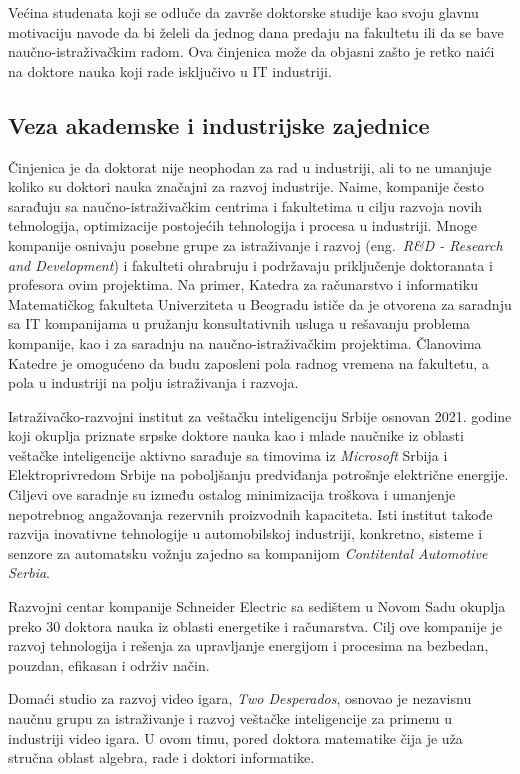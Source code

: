\documentclass[a4paper]{article}
\begin{document}
Većina studenata koji se odluče da završe doktorske studije kao svoju glavnu motivaciju navode da bi želeli da jednog dana predaju na fakultetu ili da se bave naučno-istraživačkim radom. Ova činjenica može da objasni zašto je retko naići na doktore nauka koji rade isključivo u IT industriji.

\subsection{Veza akademske i industrijske zajednice}

Činjenica je da doktorat nije neophodan za rad u industriji, ali to ne umanjuje koliko su doktori nauka značajni za razvoj industrije. Naime, kompanije često sarađuju sa naučno-istraživačkim centrima i fakultetima u cilju razvoja novih tehnologija, optimizacije postojećih tehnologija i procesa u industriji. Mnoge kompanije osnivaju posebne grupe za istraživanje i razvoj (eng.~{\em R\&D - Research and Development}) i fakulteti ohrabruju i podržavaju priključenje doktoranata i profesora ovim projektima. Na primer, Katedra za računarstvo i informatiku Matematičkog fakulteta Univerziteta u Beogradu ističe da je otvorena za saradnju sa IT kompanijama u pružanju konsultativnih usluga u rešavanju problema kompanije, kao i za saradnju na naučno-istraživačkim projektima. Članovima Katedre je omogućeno da budu zaposleni pola radnog vremena na fakultetu, a pola u industriji na polju istraživanja i razvoja.\cite{katedra}

Istraživačko-razvojni institut za veštačku inteligenciju Srbije osnovan 2021. godine koji okuplja priznate srpske doktore nauka kao i mlade naučnike iz oblasti veštačke inteligencije aktivno sarađuje sa timovima iz \textit{Microsoft} Srbija i Elektroprivredom Srbije na poboljšanju predviđanja potrošnje električne energije. Ciljevi ove saradnje su između ostalog minimizacija troškova i umanjenje nepotrebnog angažovanja rezervnih proizvodnih kapaciteta.\cite{ivi} Isti institut takođe razvija inovativne tehnologije u automobilskoj industriji, konkretno, sisteme i senzore za automatsku vožnju zajedno sa kompanijom \textit{Contitental Automotive Serbia}\cite{continental}.

Razvojni centar kompanije Schneider Electric sa sedištem u Novom Sadu okuplja preko 30 doktora nauka iz oblasti energetike i računarstva. Cilj ove kompanije je razvoj tehnologija i rešenja za upravljanje energijom i procesima na bezbedan, pouzdan, efikasan i održiv način\cite{schneider}.

Domaći studio za razvoj video igara, \textit{Two Desperados}, osnovao je nezavisnu naučnu grupu za istraživanje i razvoj veštačke inteligencije za primenu u industriji video igara. U ovom timu, pored doktora matematike čija je uža stručna oblast algebra, rade i doktori informatike\cite{twoDesp}.
\end{document}
